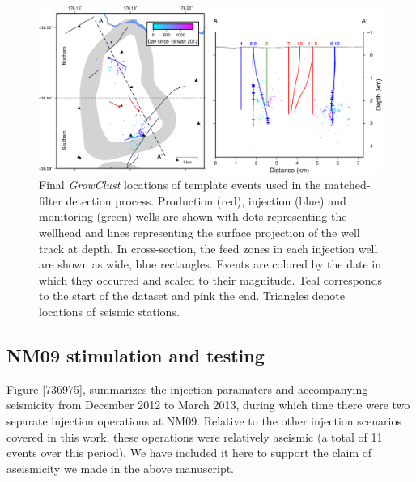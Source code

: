 \begin{figure}
\begin{center}
\includegraphics[width=0.9\columnwidth,keepaspectratio]{Chapter_3_Nga/figures/temp_locs/mrp_DD_Nga_temps_GC_11-28-18}
\caption[Template event locations]{{Final \textit{GrowClust} locations of template events used in the matched-filter detection
process. Production (red), injection (blue) and monitoring (green) wells are shown with dots
representing the wellhead and lines representing the surface projection
of the well track at depth. In cross-section, the feed zones in each
injection well are shown as wide, blue rectangles. Events are colored by
the date in which they occurred and scaled to their magnitude. Teal
corresponds to the start of the dataset and pink the end. Triangles
denote locations of seismic stations.
{\label{660578}}%
}}
\end{center}
\end{figure}

\subsection{NM09 stimulation and testing}
Figure \ref{736975}, summarizes the injection paramaters and accompanying seismicity from December 2012 to March 2013, during which time there were two separate injection operations at NM09. Relative to the other injection scenarios covered in this work, these operations were relatively aseismic (a total of 11 events over this period). We have included it here to support the claim of aseismicity we made in the above manuscript.

